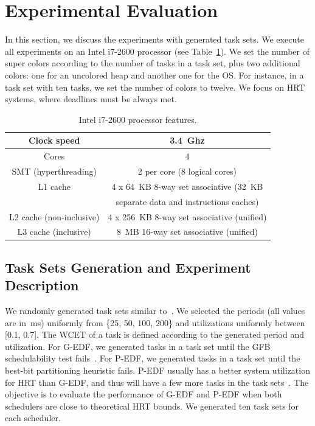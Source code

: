 \documentclass[10pt, conference, compsocconf]{IEEEtran}
\begin{document}
\section{Experimental Evaluation}
\label{sec:eval}

In this section, we discuss the experiments with generated task sets. We execute all experiments on an Intel i7-2600 processor (see Table~\ref{tab:intel-i7}). We set the number of super colors according to the number of tasks in a task set, plus two additional colors: one for an uncolored heap and another one for the OS. For instance, in a task set with ten tasks, we set the number of colors to twelve. We focus on HRT systems, where deadlines must be always met.

\begin{table}[htb]
\begin{center}
\caption{Intel i7-2600 processor features.}
\tiny{
\begin{tabular}{|c|c|}
\hline
Clock speed & 3.4~Ghz\\
\hline
Cores & 4\\
\hline
SMT (hyperthreading) & 2 per core (8 logical cores)\\
\hline
L1 cache & 4 x 64~KB 8-way set associative (32~KB \\
         & separate data and instructions caches)\\
\hline
L2 cache (non-inclusive) & 4 x 256~KB 8-way set associative (unified)\\
\hline
L3 cache (inclusive) & 8~MB 16-way set associative (unified)\\
\hline
\end{tabular}
}
\label{tab:intel-i7}
\end{center}
\end{table}

\subsection{Task Sets Generation and Experiment Description}
\label{sec:task_generation}

We randomly generated task sets similar to~\cite{Kenna:2013}. We selected the periods (all values are in~\si{\milli\second}) uniformly from \{25, 50, 100, 200\} and utilizations uniformly between [0.1, 0.7]. The WCET of a task is defined according to the generated period and utilization. For G-EDF, we generated tasks in a task set until the GFB schedulability test fails~\cite{Goossens:2003}. For P-EDF, we generated tasks in a task set until the best-bit partitioning heuristic fails. P-EDF usually has a better system utilization for HRT than G-EDF, and thus will have a few more tasks in the task sets~\cite{Gracioli:2013}. The objective is to evaluate the performance of G-EDF and P-EDF when both schedulers are close to theoretical HRT bounds. We generated ten task sets for each scheduler.
\end{document}
